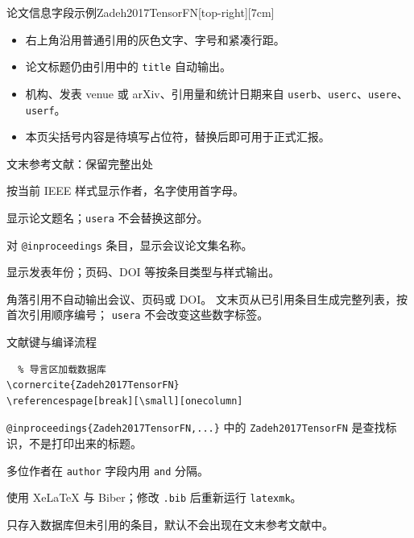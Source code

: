 \begin{paperframe}[字段实际呈现]{论文信息字段示例}{Zadeh2017TensorFN}[top-right][7cm]
  \begin{itemize}
    \item 右上角沿用普通引用的灰色文字、字号和紧凑行距。
    \item 论文标题仍由引用中的 \texttt{title} 自动输出。
    \item 机构、发表 venue 或 arXiv、引用量和统计日期来自 \texttt{userb}、\texttt{userc}、\texttt{usere}、\texttt{userf}。
    \item 本页尖括号内容是待填写占位符，替换后即可用于正式汇报。
  \end{itemize}
\end{paperframe}

\begin{frame}{文末参考文献：保留完整出处}
  \begin{description}
    \item[\texttt{author}] 按当前 IEEE 样式显示作者，名字使用首字母。
    \item[\texttt{title}] 显示论文题名；\texttt{usera} 不会替换这部分。
    \item[\texttt{booktitle}] 对 \texttt{@inproceedings} 条目，显示会议论文集名称。
    \item[\texttt{year}] 显示发表年份；页码、DOI 等按条目类型与样式输出。
  \end{description}
  \begin{notebox}[角落与文末的区别]
    角落引用不自动输出会议、页码或 DOI。
    文末页从已引用条目生成完整列表，按首次引用顺序编号；
    \texttt{usera} 不会改变这些数字标签。
  \end{notebox}
\end{frame}

\begin{frame}[fragile]{文献键与编译流程}
  \begin{verbatim}
  % 导言区加载数据库
\cornercite{Zadeh2017TensorFN}
\referencespage[break][\small][onecolumn]
  \end{verbatim}
  \begin{description}[文献键]
    \item[文献键] \texttt{@inproceedings\{Zadeh2017TensorFN,...\}} 中的
      \texttt{Zadeh2017TensorFN} 是查找标识，不是打印出来的标题。
    \item[作者名] 多位作者在 \texttt{author} 字段内用 \texttt{and} 分隔。
    \item[编译] 使用 XeLaTeX 与 Biber；修改 \texttt{.bib} 后重新运行 \texttt{latexmk}。
  \end{description}
  \medskip
  只存入数据库但未引用的条目，默认不会出现在文末参考文献中。
\end{frame}
